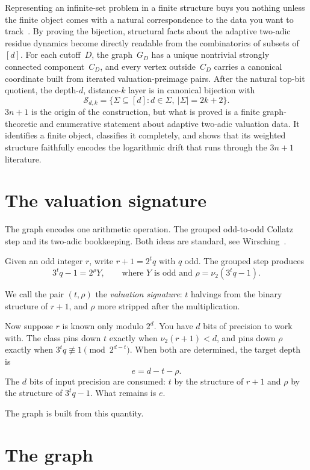 \documentclass[11pt]{amsart}
\theoremstyle{definition}
\theoremstyle{remark}
\newcommand{\Sfam}{\mathcal S}
\begin{document}
Representing an infinite-set problem in a finite structure buys you nothing
unless the finite object comes with a natural correspondence to the data you
want to track~\cite{Stanley2012, FlajoletSedgewick2009}.  By proving the
bijection, structural facts about the adaptive two-adic residue dynamics become
directly readable from the combinatorics of subsets of~$[d]$.  For each
cutoff~$D$, the graph~$G_D$ has a unique nontrivial strongly connected
component~$C_D$, and every vertex outside~$C_D$ carries a canonical coordinate
built from iterated valuation-preimage pairs.  After the natural top-bit
quotient, the depth-$d$, distance-$k$ layer is in canonical bijection with
\[
\Sfam_{d,k}=\{\Sigma\subseteq[d]:d\in\Sigma,\ |\Sigma|=2k+2\}.
\]
$3n+1$ is the origin of the construction, but what is proved is a finite
graph-theoretic and enumerative statement about adaptive two-adic valuation
data.  It identifies a finite object, classifies it completely, and shows that
its weighted structure faithfully encodes the logarithmic drift that runs
through the $3n+1$ literature.

\section{The valuation signature}\label{sec:syracuse}
The graph encodes one arithmetic operation. The grouped odd-to-odd
Collatz step and its two-adic bookkeeping. Both ideas are standard,
see Wirsching~\cite{Wirsching1998}.

Given an odd integer $r$, write $r+1=2^tq$ with $q$ odd.  The grouped
step produces
\[
3^t q - 1 = 2^\rho Y,
\qquad
\text{where } Y \text{ is odd and } \rho = \nu_2(3^t q - 1).
\]

We call the pair $(t,\rho)$ the \emph{valuation signature}: $t$
halvings from the binary structure of $r+1$, and $\rho$ more stripped
after the multiplication.

Now suppose $r$ is known only modulo $2^d$.  You have $d$ bits of
precision to work with.  The class pins down $t$ exactly when
$\nu_2(r+1)<d$, and pins down $\rho$ exactly when
$3^tq\not\equiv1\pmod{2^{d-t}}$.  When both are determined, the
target depth is
\[
e=d-t-\rho.
\]
The $d$ bits of input precision are consumed: $t$ by the structure of
$r+1$ and $\rho$ by the structure of $3^tq-1$.  What remains is $e$.

The graph is built from this quantity.

\section{The graph}\label{sec:graph}
\end{document}
